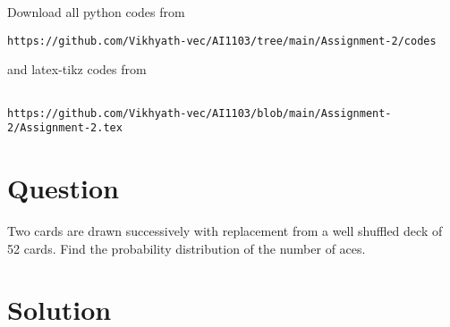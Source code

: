 \documentclass[journal,12pt,twocolumn]{IEEEtran}
\begin{document}
\maketitle
\newpage
\bigskip
\renewcommand{\thefigure}{\theenumi}
\renewcommand{\thetable}{\theenumi}
Download all python codes from 
\begin{lstlisting}
https://github.com/Vikhyath-vec/AI1103/tree/main/Assignment-2/codes
\end{lstlisting}
%
and latex-tikz codes from 
%
\begin{lstlisting}

https://github.com/Vikhyath-vec/AI1103/blob/main/Assignment-2/Assignment-2.tex
\end{lstlisting}
\section*{Question}
Two cards are drawn successively with replacement from a well shuffled deck of 52 cards. Find the probability distribution of the number of aces.

\section*{Solution}
\end{document}
